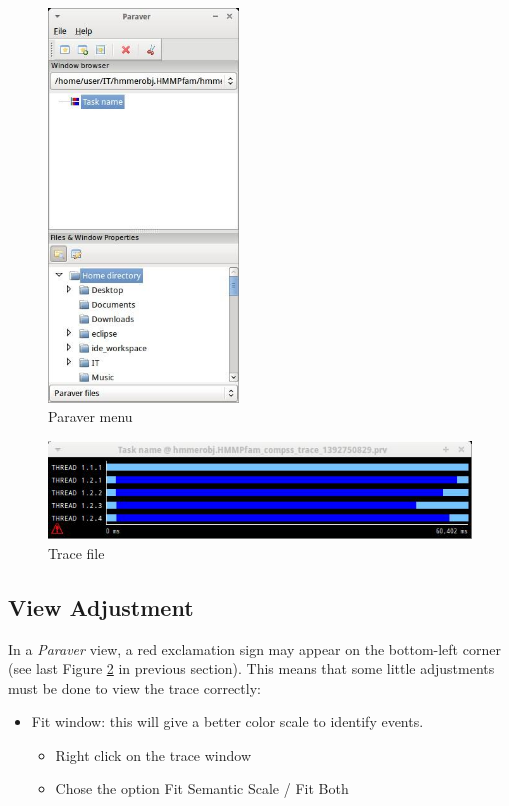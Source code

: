 \begin{figure}[ht!]
  \centering
    \includegraphics[width=0.45\textwidth]{./Sections/3_Visualization/Figures/1.jpeg}
    \caption{Paraver menu}
    \label{fig:trace_1}
\end{figure}

\begin{figure}[ht!]
  \centering
    \includegraphics[width=1.0\textwidth]{./Sections/3_Visualization/Figures/2.jpeg}
    \caption{Trace file}
    \label{fig:trace_2}
\end{figure}

\subsection{View Adjustment}
In a \textit{Paraver} view, a red exclamation sign may appear on the bottom-left corner (see last Figure \ref{fig:trace_2} in 
previous section). This means that some little adjustments must be done to view the trace correctly:

\begin{itemize}
 \item Fit window: this will give a better color scale to identify events.
	\begin{itemize}
	    \item Right click on the trace window
	    \item Chose the option Fit Semantic Scale / Fit Both
	\end{itemize}
\end{itemize}

